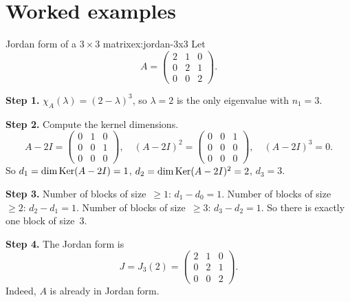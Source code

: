\section{Worked examples}\label{sec:jordan-examples}

\begin{example}{Jordan form of a $3 \times 3$ matrix}{ex:jordan-3x3}
Let
\[
  A = \begin{pmatrix} 2 & 1 & 0 \\ 0 & 2 & 1 \\ 0 & 0 & 2
  \end{pmatrix}.
\]

\textbf{Step 1.}  $\chi_A(\lambda) = (2 - \lambda)^3$, so $\lambda = 2$
is the only eigenvalue with $n_1 = 3$.

\textbf{Step 2.}  Compute the kernel dimensions.
\[
  A - 2I = \begin{pmatrix} 0 & 1 & 0 \\ 0 & 0 & 1 \\ 0 & 0 & 0
  \end{pmatrix}, \quad
  (A - 2I)^2 = \begin{pmatrix} 0 & 0 & 1 \\ 0 & 0 & 0 \\ 0 & 0 & 0
  \end{pmatrix}, \quad
  (A - 2I)^3 = 0.
\]
So $d_1 = \dim\operatorname{Ker}(A - 2I) = 1$, $d_2 = \dim\operatorname{Ker}(A - 2I)^2 = 2$,
$d_3 = 3$.

\textbf{Step 3.}  Number of blocks of size~$\geq 1$: $d_1 - d_0 = 1$.
Number of blocks of size~$\geq 2$: $d_2 - d_1 = 1$.
Number of blocks of size~$\geq 3$: $d_3 - d_2 = 1$.
So there is exactly one block of size~$3$.

\textbf{Step 4.}  The Jordan form is
\[
  J = J_3(2) = \begin{pmatrix} 2 & 1 & 0 \\ 0 & 2 & 1 \\ 0 & 0 & 2
  \end{pmatrix}.
\]
Indeed, $A$ is already in Jordan form.
\end{example}


